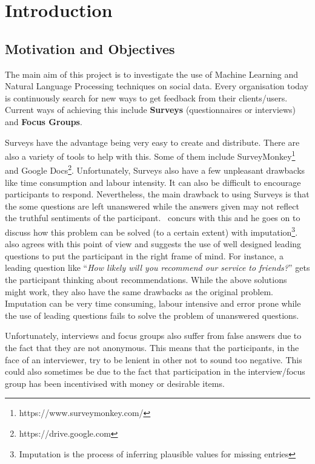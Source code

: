 
\chapter{Introduction}


\section{Motivation and Objectives}
The main aim of this project is to investigate the use of Machine Learning and Natural Language
Processing techniques on social data. Every organisation today is continuously search for new ways
to get feedback from their clients/users. Current ways of achieving this include
\textbf{Surveys} (questionnaires or interviews) and \textbf{Focus Groups}.

Surveys have the advantage being very easy to create and distribute. There are also a variety of
tools to help with this. Some of them include SurveyMonkey\footnote{https://www.surveymonkey.com/}
and Google Docs\footnote{https://drive.google.com}. Unfortunately, Surveys also have a few
unpleasant drawbacks like time consumption and labour intensity. It can also be difficult to
encourage participants to respond. Nevertheless, the main drawback to using Surveys is that the some
questions are left unanswered while the answers given may not reflect the truthful sentiments of the
participant.~\cite{DonaldBRubin1987} concurs with this and he goes on to discuss how this problem
can be solved (to a certain extent) with imputation\footnote{Imputation is the process of inferring
plausible values for missing entries}.~\cite{BobEHayes2008} also agrees with this point of view and
suggests the use of well designed leading questions to put the participant in the right frame of
mind. For instance, a leading question like ``\textit{How likely will you recommend our service to
friends?}'' gets the participant thinking about recommendations. While the above solutions might
work, they also have the same drawbacks as the original problem. Imputation can be very time
consuming, labour intensive and error prone while the use of leading questions fails to solve the
problem of unanswered questions.

Unfortunately, interviews and focus groups also suffer from false answers due to the fact that they
are not anonymous. This means that the participants, in the face of an interviewer, try to be
lenient in other not to sound too negative. This could also sometimes be due to the fact that
participation in the interview/focus group has been incentivised with money or desirable items.

